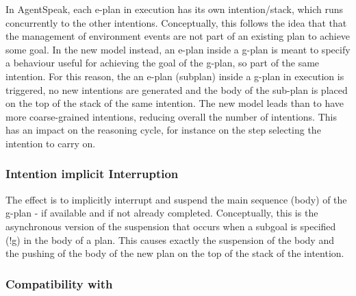 In AgentSpeak, each e-plan in execution has its own intention/stack, which runs concurrently to the other intentions. Conceptually, this follows the idea that that the management of environment events are not part of an existing plan to achieve some goal.
%
In the new model instead, an e-plan inside a g-plan is meant to specify a behaviour useful for achieving the goal of the g-plan, so part of the same intention.
%
For this reason, the an e-plan (subplan) inside a g-plan in execution is triggered, no new intentions are generated and the body of the sub-plan is placed on the top of the stack of the same intention. 
%
The new model leads than to have more coarse-grained intentions, reducing overall the number of intentions. This has an impact on the reasoning cycle, for instance on the step selecting the intention to carry on.

\subsubsection{Intention implicit Interruption}

The effect is to implicitly interrupt and suspend the main sequence (body) of the g-plan - if available and if not already completed.
%
Conceptually, this is the asynchronous version of the suspension that occurs when a subgoal is specified (!g) in the body of a plan. This causes exactly the suspension of the body and the pushing of the body of the new plan on the top of the stack of the intention.

\subsubsection{Compatibility with {\asl}}

